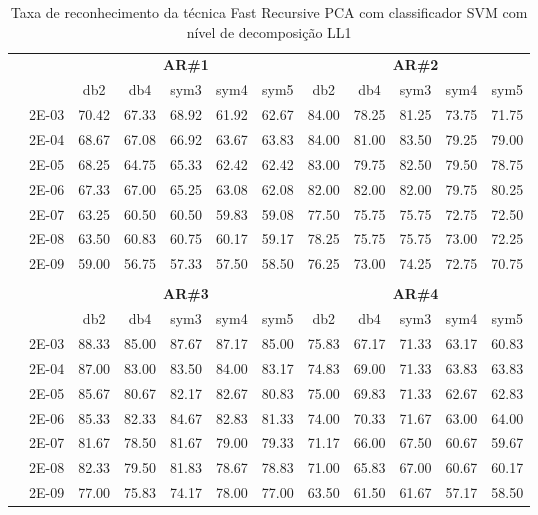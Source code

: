 \begin{table}[H]
	\centering
    \normalsize
	\caption{Taxa de reconhecimento da técnica Fast Recursive PCA com classificador SVM com nível de decomposição LL1}
	\begin{tabular}{|c|c|c c c c c|c c c c c|}
\cline{3-12}
\multicolumn{2}{c|}{\multirow{2}{*}{}} & \multicolumn{5}{c|}{\textbf{AR\#1}}  & \multicolumn{5}{c|}{\textbf{AR\#2}} \\\cline{3-12}

\multicolumn{2}{c|}{}  & db2 & db4 & sym3 & sym4 & sym5 & db2 & db4& sym3 & sym4 & sym5 \\\hline
\multicolumn{1}{|c|}{ \multirow{6}{*}{\rotatebox[origin=c]{90}{\textbf{Gamma}}} }
&2E-03&	70.42&	67.33&	68.92&	61.92&	62.67&	84.00&	78.25&	81.25&	73.75&	71.75	\\\cline{2-12}
&2E-04&	68.67&	67.08&	66.92&	63.67&	63.83&	84.00&	81.00&	83.50&	79.25&	79.00	\\\cline{2-12}
&2E-05&	68.25&	64.75&	65.33&	62.42&	62.42&	83.00&	79.75&	82.50&	79.50&	78.75	\\\cline{2-12}
&2E-06&	67.33&	67.00&	65.25&	63.08&	62.08&	82.00&	82.00&	82.00&	79.75&	80.25	\\\cline{2-12}
&2E-07&	63.25&	60.50&	60.50&	59.83&	59.08&	77.50&	75.75&	75.75&	72.75&	72.50	\\\cline{2-12}
&2E-08&	63.50&	60.83&	60.75&	60.17&	59.17&	78.25&	75.75&	75.75&	73.00&	72.25	\\\cline{2-12}
&2E-09&	59.00&	56.75&	57.33&	57.50&	58.50&	76.25&	73.00&	74.25&	72.75&	70.75	

\\ \midrule
\multicolumn{12}{c}{}\\ 

\cline{3-12}
\multicolumn{2}{c}{} & \multicolumn{5}{|c|}{\textbf{AR\#3}}  & \multicolumn{5}{c|}{\textbf{AR\#4}} \\\cline{3-12}
\multicolumn{2}{c}{}  & \multicolumn{1}{|c}{db2} & db4 & sym3 & sym4 & sym5 & db2 & db4& sym3 & sym4 & sym5 \\\hline
\multicolumn{1}{|c|}{ \multirow{6}{*}{\rotatebox[origin=c]{90}{\textbf{Gamma}}} }
&2E-03&	88.33&	85.00&	87.67&	87.17&	85.00&	75.83&	67.17&	71.33&	63.17&	60.83	\\\cline{2-12}
&2E-04&	87.00&	83.00&	83.50&	84.00&	83.17&	74.83&	69.00&	71.33&	63.83&	63.83	\\\cline{2-12}
&2E-05&	85.67&	80.67&	82.17&	82.67&	80.83&	75.00&	69.83&	71.33&	62.67&	62.83	\\\cline{2-12}
&2E-06&	85.33&	82.33&	84.67&	82.83&	81.33&	74.00&	70.33&	71.67&	63.00&	64.00	\\\cline{2-12}
&2E-07&	81.67&	78.50&	81.67&	79.00&	79.33&	71.17&	66.00&	67.50&	60.67&	59.67	\\\cline{2-12}
&2E-08&	82.33&	79.50&	81.83&	78.67&	78.83&	71.00&	65.83&	67.00&	60.67&	60.17	\\\cline{2-12}
&2E-09&	77.00&	75.83&	74.17&	78.00&	77.00&	63.50&	61.50&	61.67&	57.17&	58.50	

	
\\\midrule
\end{tabular}

\end{table}
